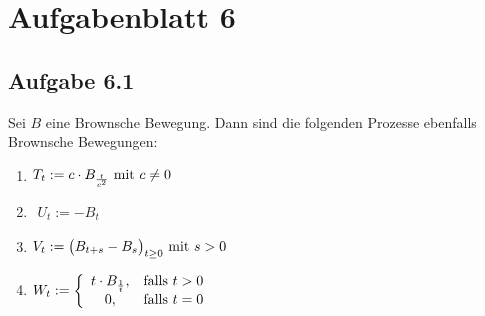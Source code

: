 
\section{Aufgabenblatt 6}
\subsection{Aufgabe 6.1}
Sei $B$ eine Brownsche Bewegung.
Dann sind die folgenden Prozesse ebenfalls Brownsche Bewegungen:
\begin{enumerate}[label=\alph*)]
	\item $\begin{aligned}
		T_t:=c\cdot B_{\frac{t}{c^2}}\mit c\neq0
	\end{aligned}$
	\item $\begin{aligned}
		U_t:=-B_t
	\end{aligned}$
	\item $\begin{aligned}
		V_t:=\big(B_{t+s}-B_s\big)_{t\geq0}\mit s>0
	\end{aligned}$
	\item $\begin{aligned}
		W_t:=\left\lbrace\begin{array}{cl}
			t\cdot B_{\frac{1}{t}} ,&\falls t>0\\
			0, &\falls t=0
		\end{array}\right.
	\end{aligned}$
\end{enumerate}

